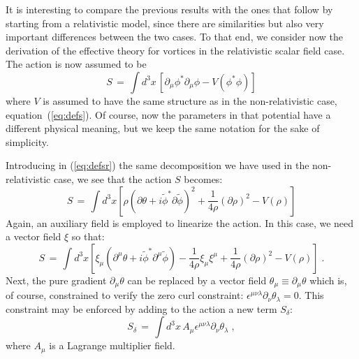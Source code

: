 \documentclass[a4paper,12pt]{article} \tolerance=200
\begin{document}
It is interesting to compare the previous results with the ones that
follow by starting from a relativistic model, since there are
similarities but also very important differences between the two
cases. To that end, we consider now the derivation of the effective
theory for vortices in the relativistic scalar field case.  The action
is now assumed to be
\begin{equation}\label{eq:defsr}
S \,=\, \int d^3x \, \left[ \partial_\mu \phi^* \partial_\mu \phi - V(\phi^* \phi) \right]
\end{equation} 
where $V$ is assumed to have the same structure as in the
non-relativistic case, equation~(\ref{eq:defs}). Of course, now the
parameters in that potential have a different physical meaning, but we
keep the same notation for the sake of simplicity.

Introducing in (\ref{eq:defsr}) the same decomposition we have used in
the non-relativistic case, we see that the action $S$ becomes:
\begin{equation}\label{eq:sr1}
S \,=\, \int d^3x \left[ \rho (\partial \theta + i {\tilde \phi}^*
\partial {\tilde \phi})^2   + \frac{1}{4 \rho} (\partial \rho )^2
- V(\rho) \right]
\end{equation}
Again, an auxiliary field is employed to linearize the action. In this
case, we need a vector field $\xi$ so that:
\begin{equation}\label{eq:sr2}
S \,=\, \int d^3x \left[ \xi_\mu (\partial^\mu \theta + i {\tilde \phi}^*
\partial^\mu {\tilde \phi}) - \frac{1}{4 \rho} \xi_\mu \xi^\mu 
+\frac{1}{4\rho} (\partial \rho )^2  - V(\rho) \right] \;.
\end{equation}
Next, the pure gradient $\partial_\mu \theta$ can be replaced by a 
vector field $\theta_\mu \equiv \partial_\mu \theta$ which is, of course,
constrained to verify the zero curl constraint: $\epsilon^{\mu\nu\lambda}
\partial_\nu \theta_\lambda = 0$. This constraint may be enforced by adding
to the action a new term $S_\delta$:
\begin{equation}\label{eq:sdelta}
S_\delta \,=\, \int d^3x \, A_\mu \epsilon^{\mu\nu\lambda} \partial_\nu \theta_\lambda \;,
\end{equation} 
where $A_\mu$ is a Lagrange multiplier field.
\end{document}
